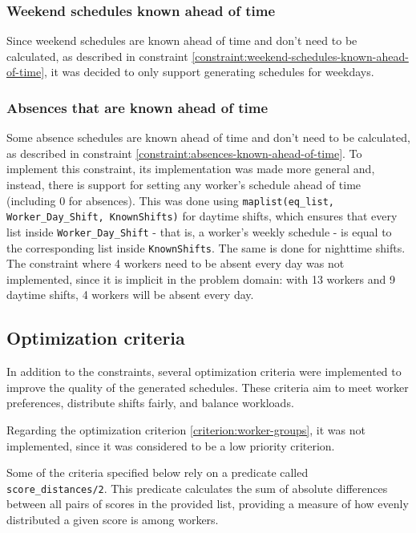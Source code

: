 \documentclass[conference]{IEEEtran}
\def\constraint#1{\vspace{4pt} {#1}}
\begin{document}
\constraint {
    \subsubsection*{Weekend schedules known ahead of time}   
    Since weekend schedules are known ahead of time and don't need to be calculated, as described in constraint \ref{constraint:weekend-schedules-known-ahead-of-time}, it was decided to only support generating schedules for weekdays.
}
    
\constraint {
    \subsubsection*{Absences that are known ahead of time}
    Some absence schedules are known ahead of time and don't need to be calculated, as described in constraint \ref{constraint:absences-known-ahead-of-time}. To implement this constraint, its implementation was made more general and, instead, there is support for setting any worker's schedule ahead of time (including 0 for absences).
    This was done using \texttt{maplist(eq\_list, Worker\_Day\_Shift, KnownShifts)} for daytime shifts, which ensures that every list inside \texttt{Worker\_Day\_Shift} - that is, a worker's weekly schedule - is equal to the corresponding list inside \texttt{KnownShifts}. The same is done for nighttime shifts.
    The constraint where 4 workers need to be absent every day was not implemented, since it is implicit in the problem domain: with 13 workers and 9 daytime shifts, 4 workers will be absent every day.
}

\subsection{Optimization criteria}
\label{section:optimization-criteria}

In addition to the constraints, several optimization criteria were implemented to improve the quality of the generated schedules. These criteria aim to meet worker preferences, distribute shifts fairly, and balance workloads.

Regarding the optimization criterion \ref{criterion:worker-groups}, it was not implemented, since it was considered to be a low priority criterion.

Some of the criteria specified below rely on a predicate called \texttt{score\_distances/2}. This predicate calculates the sum of absolute differences between all pairs of scores in the provided list, providing a measure of how evenly distributed a given score is among workers.
\end{document}
